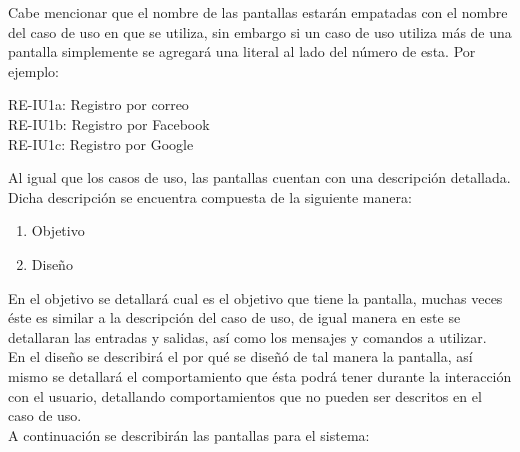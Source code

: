 Cabe mencionar que el nombre de las pantallas estarán empatadas con el nombre del caso de uso en que se utiliza, sin embargo si un caso de uso utiliza más de una pantalla simplemente se agregará una literal al lado del número de esta. Por ejemplo: 

\begin{center}
	RE-IU1a: Registro por correo\\
	RE-IU1b: Registro por Facebook\\
	RE-IU1c: Registro por Google\\
\end{center}

Al igual que los casos de uso, las pantallas cuentan con una descripción detallada. Dicha descripción se encuentra compuesta de la siguiente manera:

\begin{enumerate}
	\item Objetivo
	\item Diseño
\end{enumerate}

En el objetivo se detallará cual es el objetivo que tiene la pantalla, muchas veces éste es similar a la descripción del caso de uso, de igual manera en este se detallaran las entradas y salidas, así como los mensajes y comandos a utilizar. \\

En el diseño se describirá el por qué se diseñó de tal manera la pantalla, así mismo se detallará el comportamiento que ésta podrá tener durante la interacción con el usuario, detallando comportamientos que no pueden ser descritos en el caso de uso.\\

A continuación se describirán las pantallas para el sistema:

